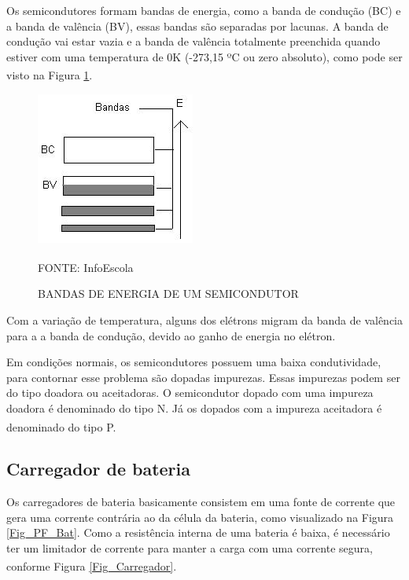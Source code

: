 \documentclass[
	12pt,				%
	openright,			%
	oneside,			%
	a4paper,			%
	english,			%
	french,				%
	spanish,			%
	brazil,				%
	oldfontcommands
	]{abntex2}
\begin{document}
	Os semicondutores formam bandas de energia, como a banda de condução (BC) e a banda de valência (BV), essas bandas são separadas por lacunas. A banda de condução vai estar vazia e a banda de valência totalmente preenchida quando estiver com uma temperatura de 0K (-273,15 ºC ou zero absoluto), como pode ser visto na Figura \ref{Fig_bandas}.\textsuperscript{\cite{semicondutores2}}\textsuperscript{\cite{kelvin}}
	
	\begin{figure}[th]
		\caption{BANDAS DE ENERGIA DE UM SEMICONDUTOR}
		\label{Fig_bandas}
		\centering
		\includegraphics[width=0.3\linewidth]{./figs/banda}
			
		\begin{small}
			FONTE: InfoEscola\textsuperscript{\cite{semicondutores2}}
		\end{small}		
	\end{figure}

	Com a variação de temperatura, alguns dos elétrons migram da banda de valência para a a banda de condução, devido ao ganho de energia no elétron.

	Em condições normais, os semicondutores possuem uma baixa condutividade, para contornar esse problema são dopadas impurezas. Essas impurezas podem ser do tipo doadora ou aceitadoras. O semicondutor dopado com uma impureza doadora é denominado do tipo N. Já os dopados com a impureza aceitadora é denominado do tipo P.\textsuperscript{\cite{semicondutores2}}
	
\subsection[Carregador de bateria]{Carregador de bateria}

	Os carregadores de bateria basicamente consistem em uma fonte de corrente que gera uma corrente contrária ao da célula da bateria, como visualizado na Figura \ref{Fig_PF_Bat}. Como a resistência interna de uma bateria é baixa, é necessário ter um limitador de corrente para manter a carga com uma corrente segura, conforme Figura \ref{Fig_Carregador}.\textsuperscript{\cite{carregador}}
	
\end{document}
